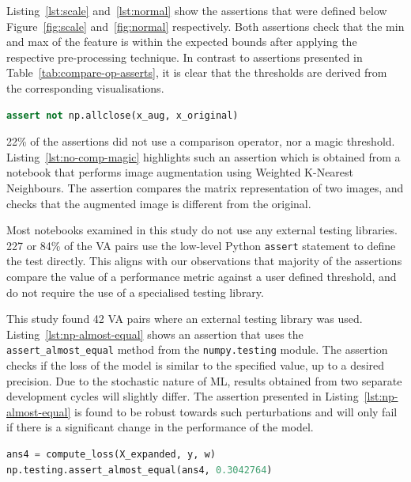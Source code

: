 Listing~\ref{lst:scale} and~\ref{lst:normal} show the assertions that were defined below Figure~\ref{fig:scale} and~\ref{fig:normal} respectively. Both assertions check that the min and max of the feature is within the expected bounds after applying the respective pre-processing technique. In contrast to assertions presented in Table~\ref{tab:compare-op-asserts}, it is clear that the thresholds are derived from the corresponding visualisations.

\begin{lstlisting}[language=Python, caption={Assertion to check that an augmented image is different from the original.}, label={lst:no-comp-magic}]
assert not np.allclose(x_aug, x_original)
\end{lstlisting}

22\% of the assertions did not use a comparison operator, nor a magic threshold. Listing~\ref{lst:no-comp-magic} highlights such an assertion which is obtained from a notebook that performs image augmentation using Weighted K-Nearest Neighbours. The assertion compares the matrix representation of two images, and checks that the augmented image is different from the original.

Most notebooks examined in this study do not use any external testing libraries. 227 or 84\% of the VA pairs use the low-level Python \texttt{assert} statement to define the test directly. This aligns with our observations that majority of the assertions compare the value of a performance metric against a user defined threshold, and do not require the use of a specialised testing library. 

This study found 42 VA pairs where an external testing library was used. Listing~\ref{lst:np-almost-equal} shows an assertion that uses the \texttt{assert\_almost\_equal} method from the \texttt{numpy.testing} module. The assertion checks if the loss of the model is similar to the specified value, up to a desired precision. Due to the stochastic nature of ML, results obtained from two separate development cycles will slightly differ. The assertion presented in Listing~\ref{lst:np-almost-equal} is found to be robust towards such perturbations and will only fail if there is a significant change in the performance of the model.

\begin{lstlisting}[language=Python, caption={Assertion to check that the loss of the model is similar to the specified value.}, label={lst:np-almost-equal}]
ans4 = compute_loss(X_expanded, y, w)
np.testing.assert_almost_equal(ans4, 0.3042764) 
\end{lstlisting}


